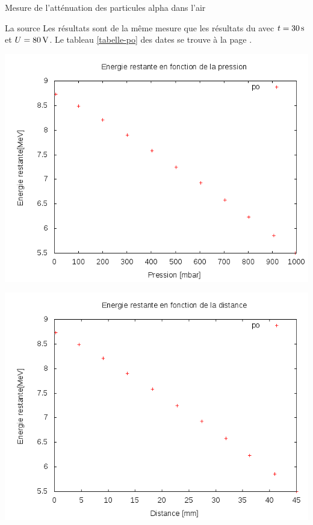 \documentclass[a4paper,11pt,liststotocnumbered,bibtotocnumbered]{scrartcl}
\begin{document}
\begin{section}{Mesure de l'atténuation des particules alpha dans l'air}
   \begin{subsection}{La source }
    Les résultats sont de la même mesure que les résultats du  avec $t=\unit[30]{s}$ et $U=\unit[80]{V}$. Le tableau \ref{tabelle-po} des dates se trouve à la page \pageref{tabelle-po}.\\
   \begin{minipage}{0.45\textwidth}
     \includegraphics[width=\textwidth]{Sabine/po_pression.png}
    \end{minipage}
    \hfill
    \begin{minipage}{0.45\textwidth}
     \includegraphics[width=\textwidth]{Sabine/po_distance.png}
    \end{minipage}
  \end{subsection}
   

\end{section}
\end{document}
